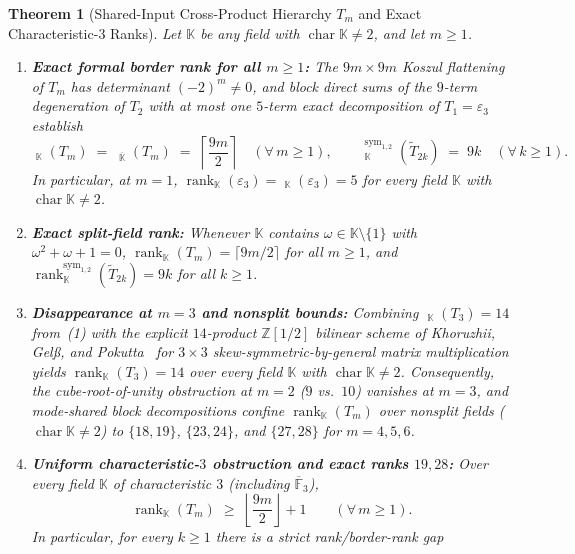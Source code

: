 \documentclass[11pt,reqno]{amsart}
\newtheorem{theorem}{Theorem}[section]
\theoremstyle{definition}
\theoremstyle{remark}
\numberwithin{equation}{section}
\newcommand{\FF}{\mathbb{F}}
\newcommand{\KK}{\mathbb{K}}
\newcommand{\ZZ}{\mathbb{Z}}
\DeclareMathOperator{\rk}{rank}
\DeclareMathOperator{\brk}{\underline{rank}}
\DeclareMathOperator{\chr}{char}
\begin{document}
\begin{theorem}[Shared-Input Cross-Product Hierarchy $T_m$ and Exact Characteristic-$3$ Ranks]\label{thm:hierarchy}
Let $\KK$ be any field with $\chr\KK \neq 2$, and let $m \ge 1$.
\begin{enumerate}[label=\textup{(\arabic*)},leftmargin=2em]
  \item \textbf{Exact formal border rank for all $m \ge 1$:} The $9m \times 9m$ Koszul flattening of $T_m$ has determinant $(-2)^m \neq 0$, and block direct sums of the $9$-term degeneration of $T_2$ with at most one $5$-term exact decomposition of $T_1 = \varepsilon_3$ establish
  \begin{equation}\label{eq:Tm-border-rank}
    \brk_{\KK}(T_m) \;=\; \brk_{\overline{\KK}}(T_m) \;=\; \left\lceil \frac{9m}{2} \right\rceil \quad (\forall\, m \ge 1), \qquad
    \brk_{\KK}^{\mathrm{sym}_{1,2}}(\widetilde{T}_{2k}) \;=\; 9k \quad (\forall\, k \ge 1).
  \end{equation}
  In particular, at $m = 1$, $\rk_{\KK}(\varepsilon_3) = \brk_{\KK}(\varepsilon_3) = 5$ for every field $\KK$ with $\chr\KK \neq 2$.
  \item \textbf{Exact split-field rank:} Whenever $\KK$ contains $\omega \in \KK\setminus\{1\}$ with $\omega^2 + \omega + 1 = 0$, $\rk_{\KK}(T_m) = \lceil 9m/2 \rceil$ for all $m \ge 1$, and $\rk_{\KK}^{\mathrm{sym}_{1,2}}(\widetilde{T}_{2k}) = 9k$ for all $k \ge 1$.
  \item \textbf{Disappearance at $m = 3$ and nonsplit bounds:} Combining $\brk_{\KK}(T_3) = 14$ from~\textup{(1)} with the explicit $14$-product $\ZZ[1/2]$ bilinear scheme of Khoruzhii, Gel\ss, and Pokutta~\cite{KGP2025} for $3 \times 3$ skew-symmetric-by-general matrix multiplication yields $\rk_{\KK}(T_3) = 14$ over every field $\KK$ with $\chr\KK \neq 2$. Consequently, the cube-root-of-unity obstruction at $m = 2$ ($9$ vs.\ $10$) vanishes at $m = 3$, and mode-shared block decompositions confine $\rk_{\KK}(T_m)$ over nonsplit fields ($\chr\KK \neq 2$) to $\{18, 19\}$, $\{23, 24\}$, and $\{27, 28\}$ for $m = 4, 5, 6$.
  \item \textbf{Uniform characteristic-$3$ obstruction and exact ranks $19, 28$:} Over every field $\KK$ of characteristic $3$ (including $\overline{\FF}_3$),
  \begin{equation}\label{eq:Tm-char3-lb}
    \rk_{\KK}(T_m) \;\ge\; \left\lfloor \frac{9m}{2} \right\rfloor + 1 \qquad (\forall\, m \ge 1).
  \end{equation}
  In particular, for every $k \ge 1$ there is a strict rank/border-rank gap

\end{enumerate}
\end{theorem}
\end{document}
